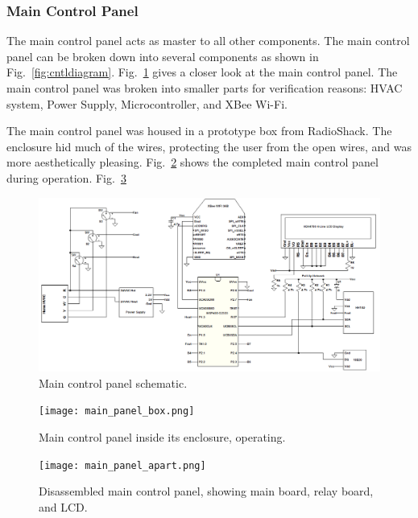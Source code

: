 \subsubsection{Main Control Panel}
The main control panel acts as master to all other components. The main control panel can be broken down into several components as shown in Fig.~\ref{fig:cntldiagram}. Fig.~\ref{fig:main_cntl_schematic} gives a closer look at the main control panel.  The main control panel was broken into smaller parts for verification reasons: HVAC system, Power Supply, Microcontroller, and XBee Wi-Fi.

The main control panel was housed in a prototype box from RadioShack.  The enclosure hid much of the wires, protecting the user from the open wires, and was more aesthetically pleasing. Fig.~\ref{fig:main_panel_box} shows the completed main control panel during operation.  Fig.~\ref{fig:main_panel_apart}
\begin{figure}
\centering
\includegraphics[width=.99\textwidth]{main_cntl_schematic.png}
\caption{Main control panel schematic.}
\label{fig:main_cntl_schematic}
\end{figure}

\begin{figure}
\centering
\texttt{[image: main\_panel\_box.png]}
\caption{Main control panel inside its enclosure, operating.}
\label{fig:main_panel_box}
\end{figure}

\begin{figure}
\centering
\texttt{[image: main\_panel\_apart.png]}
\caption{Disassembled main control panel, showing main board, relay board, and LCD.}
\label{fig:main_panel_apart}
\end{figure}


